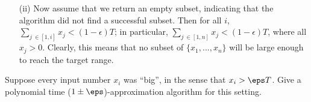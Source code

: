 \documentclass{article}
\begin{document}
\begin{solution}
\begin{subproof} [Correctness]
\begin{enumerate}
    We already know that $\sum S \smallsetminus \{x_i\} < (1 - \epsilon) T$, otherwise, we would have already returned $S = \{x_1, ..., x_{i-1}\}$ in a previous iteration. But $x_i \leq \epsilon T$, so
    \begin{align*}
        \sum S = x_i + \sum S \smallsetminus \{x_i\} \ \leq \epsilon \ T + (1 - \epsilon) T = T \leq (1 + \epsilon) T
    \end{align*}
    \vspace{-1.3cc}
    \item [(ii)] Now assume that we return an empty subset, indicating that the algorithm did not find a successful subset. Then for all $i$, $\sum_{j\ \in [1, i]} x_j < (1 - \epsilon) T$; in particular, $\sum_{j\ \in [1, n]} x_j < (1 - \epsilon) T$, where all $x_j > 0$. Clearly, this means that no subset of $\{x_1, ..., x_n\}$ will be large enough to reach the target range.
\end{enumerate}

\end{subproof}

\end{solution}
\pagebreak

\begin{subexercise} \label{qs:big}
  Suppose every input number $ x_i $ was ``big'', in the sense that $ x_i > \eps T $. Give a polynomial time ($ 1\pm \eps $)-approximation algorithm for this setting.
\end{subexercise}
\end{document}
